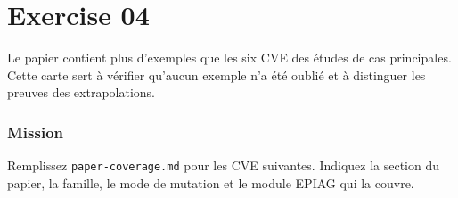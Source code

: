 \documentclass{training}
\begin{document}
\chapter{Exercise 04}
\makeheaderfiles

Le papier contient plus d'exemples que les six CVE des études de cas
principales. Cette carte sert à vérifier qu'aucun exemple n'a été oublié et
à distinguer les preuves des extrapolations.

\subsection*{Mission}

Remplissez \texttt{paper-coverage.md} pour les CVE suivantes. Indiquez la
section du papier, la famille, le mode de mutation et le module EPIAG qui
la couvre.
\end{document}
